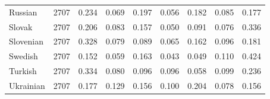 \begin{table}[!t]
\begin{tabular}[t]{lrccccccc}
Russian & 2707 & 0.234 & 0.069 & 0.197 & 0.056 & 0.182 & 0.085 & 0.177\\
Slovak & 2707 & 0.206 & 0.083 & 0.157 & 0.050 & 0.091 & 0.076 & 0.336\\
Slovenian & 2707 & 0.328 & 0.079 & 0.089 & 0.065 & 0.162 & 0.096 & 0.181\\
Swedish & 2707 & 0.152 & 0.059 & 0.163 & 0.043 & 0.049 & 0.110 & 0.424\\
Turkish & 2707 & 0.334 & 0.080 & 0.096 & 0.096 & 0.058 & 0.099 & 0.236\\
Ukrainian & 2707 & 0.177 & 0.129 & 0.156 & 0.100 & 0.204 & 0.078 & 0.156\\
\bottomrule
\end{tabular}
\end{table}
